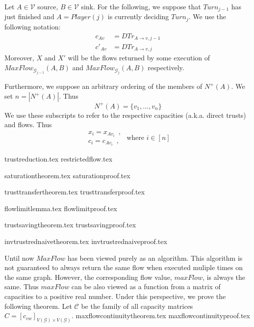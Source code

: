 \documentclass[11pt]{llncs}
\begin{document}
  Let $A \in \mathcal{V}$ source, $B \in \mathcal{V}$ sink. For the following, we suppose that $Turn_{j-1}$ has just finished
  and $A = Player\left(j\right)$ is currently deciding $Turn_j$. We use the following notation:
  \begin{align*}
     c_{Av} &= DTr_{A \rightarrow v, j-1} \\
     c'_{Av} &= DTr_{A \rightarrow v, j}
  \end{align*}
  Moreover, $X$ and $X'$ will be the flows returned by some execution of
  $MaxFlow_{\mathcal{G}_{j-1}}\left(A, B\right)$ and $MaxFlow_{\mathcal{G}_j}\left(A, B\right)$ respectively.

  Furthermore, we suppose an arbitrary ordering of the members of $N^{+}\left(A\right)$. We set $n = |N^{+}\left(A\right)|$.
  Thus
  \begin{equation*}
     N^{+}\left(A\right) = \{v_1, ..., v_n\}
  \end{equation*}
  We use these subscripts to refer to the respective capacities (a.k.a. direct trusts) and flows. Thus
  \begin{equation*}
     \begin{array}{l}
        x_i = x_{Av_i} \enspace, \\
        c_i = c_{Av_i} \enspace,
     \end{array}
     \mbox{ where } i \in [n]
  \end{equation*}

  {trustreduction.tex}
  {restrictedflow.tex}

  {saturationtheorem.tex}
  {saturationproof.tex}

  {trusttransfertheorem.tex}
  {trusttransferproof.tex}

  {flowlimitlemma.tex}
  {flowlimitproof.tex}

  {trustsavingtheorem.tex}
  {trustsavingproof.tex}

  {invtrustrednaivetheorem.tex}
  {invtrustrednaiveproof.tex}

  Until now $MaxFlow$ has been viewed purely as an algorithm. This algorithm is not guaranteed to always return the same
  flow when executed muliple times on the same graph. However, the corresponding flow value, $maxFlow$, is always the same.
  Thus $maxFlow$ can be also viewed as a function from a matrix of capacities to a positive real number. Under this
  perspective, we prove the following theorem. Let $\mathcal{C}$ be the family of all capacity matrices
  $C = [c_{vw}]_{V\left(\mathcal{G}\right) \times V\left(\mathcal{G}\right)}$.
  {maxflowcontinuitytheorem.tex}
  {maxflowcontinuityproof.tex}
\end{document}
